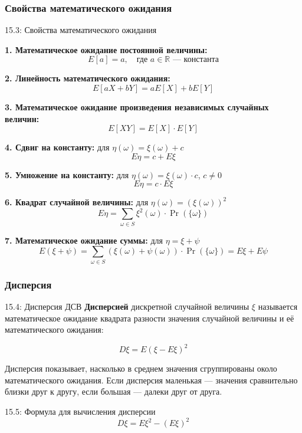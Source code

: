 \documentclass[a4paper,12pt]{article}
\begin{document}
	\subsubsection{Свойства математического ожидания}
	
	\begin{propertybox}{15.3: Свойства математического ожидания}
		
		\textbf{1. Математическое ожидание постоянной величины:}
		\[ E[a] = a, \quad \text{где } a \in \mathbb{R} \text{ — константа} \]
		
		\textbf{2. Линейность математического ожидания:}
		\[ E[aX + bY] = aE[X] + bE[Y] \]
		
		\textbf{3. Математическое ожидание произведения независимых случайных величин:}
		\[ E[XY] = E[X] \cdot E[Y] \]
		
		\textbf{4. Сдвиг на константу:} для \(\eta(\omega) = \xi(\omega) + c\)
		\[ E\eta = c + E\xi \]
		
		\textbf{5. Умножение на константу:} для \(\eta(\omega) = \xi(\omega) \cdot c\), \(c \neq 0\)
		\[ E\eta = c \cdot E\xi \]
		
		\textbf{6. Квадрат случайной величины:} для \(\eta(\omega) = (\xi(\omega))^2\)
		\[ E\eta = \sum_{\omega \in S} \xi^2(\omega) \cdot \Pr(\{\omega\}) \]
		
		\textbf{7. Математическое ожидание суммы:} для \(\eta = \xi + \psi\)
		\[ E(\xi + \psi) = \sum_{\omega \in S} (\xi(\omega) + \psi(\omega)) \cdot \Pr(\{\omega\}) = E\xi + E\psi \]
	\end{propertybox}
	
	\subsubsection{Дисперсия}
	
	\begin{definitionbox}{15.4: Дисперсия ДСВ}
		\textbf{Дисперсией} дискретной случайной величины \(\xi\) называется математическое ожидание квадрата разности значения случайной величины и её математического ожидания:
		
		\[ D\xi = E(\xi - E\xi)^2 \]
		
		Дисперсия показывает, насколько в среднем значения сгруппированы около математического ожидания. Если дисперсия маленькая — значения сравнительно близки друг к другу, если большая — далеки друг от друга.
	\end{definitionbox}
	
	\begin{theorembox}{15.5: Формула для вычисления дисперсии}
		\[ D\xi = E\xi^2 - (E\xi)^2 \]
	\end{theorembox}
	
\end{document}
